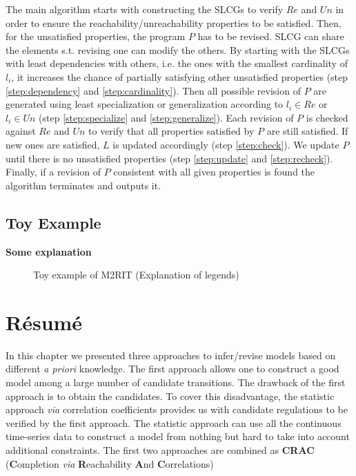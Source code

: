       
    The main algorithm starts with constructing the SLCGs to verify $Re$ and $Un$ in order to ensure the reachability/unreachability properties to be satisfied.
    Then, for the unsatisfied properties, the program $P$ has to be revised.
    SLCG can share the elements s.t. revising one can modify the others.
    By starting with the SLCGs with least dependencies with others, i.e. the ones with the smallest cardinality of $l_i$, it increases the chance of partially satisfying other unsatisfied properties (step \ref{step:dependency} and \ref{step:cardinality}). 
    Then all possible revision of $P$ are generated using least specialization or generalization according to $l_i\in Re$ or $l_i \in Un$ (step \ref{step:specialize} and \ref{step:generalize}). 
    Each revision of $P$ is checked against $Re$ and $Un$ to verify that all properties satisfied by $P$ are still satisfied. 
    If new ones are satisfied, $L$ is updated accordingly (step \ref{step:check}).
    We update $P$ until there is no unsatisfied properties (step \ref{step:update} and \ref{step:recheck}).
    Finally, if a revision of $P$ consistent with all given properties is found the algorithm terminates and outputs it.
    
\subsection{Toy Example}    
\textbf{Some explanation}
    \begin{figure}[ht]
        \centering
        
        \caption{Toy example of M2RIT (Explanation of legends)}
        \label{fig:toyExampleM2RIT}
    \end{figure}
\section{R\'esum\'e}
In this chapter we presented three approaches to infer/revise models based on different \textit{a priori} knowledge.
The first approach allows one to construct a good model among a large number of candidate transitions.
The drawback of the first approach is to obtain the candidates.
To cover this disadvantage, the statistic approach \textit{via} correlation coefficients provides us with candidate regulations to be verified by the first approach.
The statistic approach can use all the continuous time-series data to construct a model from nothing but hard to take into account additional constraints.
The first two approaches are combined as \textbf{CRAC} (\textbf{C}ompletion \textit{via} \textbf{R}eachability \textbf{A}nd \textbf{C}orrelations)

